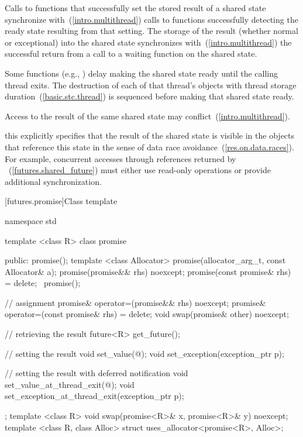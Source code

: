 \pnum
Calls to functions that successfully set the stored result of a shared
state synchronize
with~(\ref{intro.multithread}) calls to functions
successfully detecting the ready state resulting from that setting.
The storage of the result
(whether normal or exceptional) into the shared state
synchronizes with~(\ref{intro.multithread})
the successful return from a call to a waiting function on the shared state.

\pnum
Some functions (e.g., ) delay making
the shared state ready until the calling thread exits. The destruction of
each of that thread's objects with thread storage duration~(\ref{basic.stc.thread})
is sequenced before making that shared state ready.

\pnum
Access to the result of the same shared state may conflict~(\ref{intro.multithread}).
\begin{note} this explicitly specifies that the result of the shared state is
visible in the objects that reference this state in the sense of data race
avoidance~(\ref{res.on.data.races}). For example, concurrent accesses through
references returned by ~(\ref{futures.shared_future})
must either use read-only operations or provide additional synchronization.
\end{note}

[futures.promise]{Class template }

\begin{codeblock}
namespace std {
  template <class R>
  class promise {
  public:
    promise();
    template <class Allocator>
      promise(allocator_arg_t, const Allocator& a);
    promise(promise&& rhs) noexcept;
    promise(const promise& rhs) = delete;
    ~promise();

    // assignment
    promise& operator=(promise&& rhs) noexcept;
    promise& operator=(const promise& rhs) = delete;
    void swap(promise& other) noexcept;

    // retrieving the result
    future<R> get_future();

    // setting the result
    void set_value(@\seebelow@);
    void set_exception(exception_ptr p);

    // setting the result with deferred notification
    void set_value_at_thread_exit(@\seebelow@);
    void set_exception_at_thread_exit(exception_ptr p);
  };
  template <class R>
    void swap(promise<R>& x, promise<R>& y) noexcept;
  template <class R, class Alloc>
    struct uses_allocator<promise<R>, Alloc>;
}
\end{codeblock}


